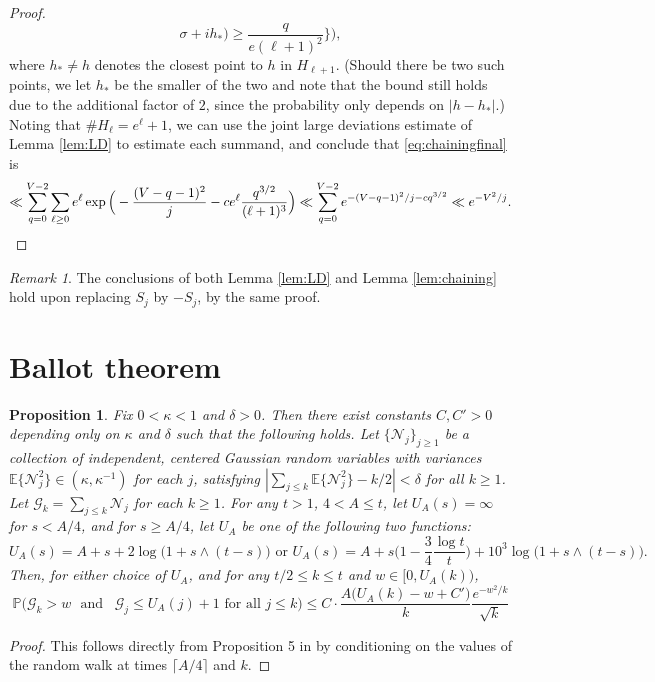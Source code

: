 \documentclass{amsart}
\newtheorem{proposition}[theorem]{Proposition}
\theoremstyle{definition}
\theoremstyle{remark}
\newtheorem{remark}[theorem]{Remark}
\numberwithin{equation}{section}
\begin{document}
\begin{proof}
\begin{equation}
        \sigma+ih_*)\geq \frac{q}{e(\ell+1)^2}\Big\}\Big),
    \end{equation}
    where $h_*\neq h$ denotes the closest point to $h$ in $H_{\ell+1}$. (Should there be two such points, we let $h_*$ be the smaller of the two and note that the bound still holds due to the additional factor of $2$, since the probability only depends on $|h-h_*|$.)
    Noting that $\#H_{\ell}=e^\ell+1$, we can use the joint large deviations estimate of Lemma \ref{lem:LD} to estimate each summand, and conclude that \eqref{eq:chainingfinal} is
    \[
        \ll {\sum_{q=0}^{V-2}\sum_{\ell\geq 0} e^\ell \exp\Big(-\frac{(V-q-1)^2}{j}-ce^\ell\frac{q^{3/2}}{(\ell+1)^3}\Big) \ll \sum_{q=0}^{V-2}  e^{-{(V-q-1)^2}/{j}-cq^{3/2}}\ll e^{-V^2/j}.}\qedhere
    \]
\end{proof}
\begin{remark}\label{rem:symmetry}
    The conclusions of both Lemma \ref{lem:LD} and Lemma \ref{lem:chaining} hold upon replacing $S_j$ by $-S_j$, by the same proof. 
\end{remark}

\section{Ballot theorem}
\begin{proposition}\label{cor:Hittingprob}
Fix $0<\kappa< 1$ and $\delta>0$. Then there exist constants $C,C'>0$ depending only on $\kappa$ and $\delta$ such that the following holds. Let $\{\mathcal{N}_j\}_{j\geq 1}$ be a collection of independent, centered Gaussian random variables with variances $\mathbb{E}\{\mathcal{N}_j^2\}\in(\kappa,\kappa^{-1})$ for each $j$, { satisfying  $|\sum_{j\leq k} \mathbb{E}\{\mathcal{N}_j^2\}-k/2|<\delta$ for all $k\geq 1$. Let $\mathcal{G}_k=\sum_{j\leq k}\mathcal{N}_j$ for each $k\geq 1$. For any $t>1$, $4<A\leq t$, let $U_A(s)=\infty$ for $s< A/4$, and for $s\geq A/4$, let $U_A$ be one of the following two functions:}
\[
    U_A(s)=A+s+2\log\big(1+s\land(t-s)\big)  \text{ or } U_A(s)=A+s\Big(1-\frac{3}{4}\frac{\log t}{t}\Big)+10^3\log\big(1+s\land(t-s)\big).
\]
Then, for either choice of $U_A$, and for any $t/2\leq k\leq t$ and $w\in [0, U_A(k))$,
    \[
        \mathbb{P}\Big(\mathcal{G}_k>w\text{ $\mathrm{and}$ }\,\mathcal{G}_j\leq U_A(j)+1 \mathrm{\,\, for\,\, all\,\, } j\leq k \Big)\leq C\cdot \frac{A\big(U_A(k)-w+C'\big)}{k}\frac{e^{-w^2/k}}{\sqrt{k}}
    \]
   
\end{proposition}
\begin{proof}
   This follows directly from Proposition 5 in \cite{FHK1} by conditioning on the values of the random walk at times $\lceil A/4\rceil$ and $k$. 
\end{proof}



\end{document}
